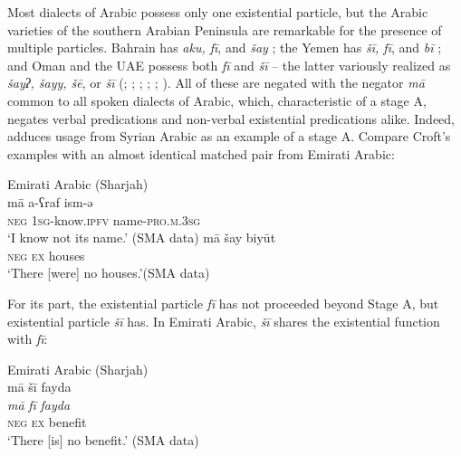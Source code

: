 \documentclass[output=paper]{langsci/langscibook}
\begin{document}
Most dialects of Arabic possess only one existential particle, but the Arabic varieties of the southern Arabian Peninsula are remarkable for the presence of multiple particles. Bahrain has \textit{aku, fī}, and \textit{šay} \citep[110]{holes2016a}; the Yemen has \textit{šī, fī}, and \textit{bī} \citep[346–348, maps 136 \& 137]{behnstedt2016a}; and Oman and the UAE possess both \textit{fī} and \textit{šī} – the latter variously realized as \textit{šayʔ, šayy, šē}, or \textit{šī} (\citealp[112]{reinhardt1894a}; \citealp[170]{johnstone1967a}; \citealp[24]{brockett1985a}; \citealp[71]{holes1990a}; \citealp[24-28]{holes2016a}; \citealp[162]{davey2016a}). All of these are negated with the negator \textit{mā} common to all spoken dialects of Arabic, which, characteristic of a stage A, negates verbal predications and non-verbal existential predications alike. Indeed, \citep[7]{Croft1991} adduces usage from Syrian Arabic as an example of a stage A. Compare Croft’s examples with an almost identical matched pair from Emirati Arabic:

\ea Emirati Arabic (Sharjah)\label{ex:WiAR-11}\\
  \ea
  	\gll mā a-ʕraf ism-ǝ\\
  	\textsc{neg} \textsc{1sg}-know.\textsc{ipfv} name-\textsc{pro.m.3sg}\\
  	\glt ‘I know not its name.’ (SMA data)
  \ex
  	\gll mā šay biyūt\\
  	\textsc{neg} \textsc{ex} houses \\
  	\glt ‘There [were] no houses.’(SMA data)
\z \z

For its part, the existential particle \textit{fī} has not proceeded beyond Stage A, but existential particle \textit{šī} has. In Emirati Arabic, \textit{šī} shares the existential function with \textit{fī}:

\ea Emirati Arabic (Sharjah)\label{ex:WiAR-12}\\
	\glll mā šī fayda\\
	\textit{mā} \textit{fī} \textit{fayda}\\
	\textsc{neg} \textsc{ex} benefit\\
	\glt ‘There [is] no benefit.’ (SMA data)
\z
\end{document}
